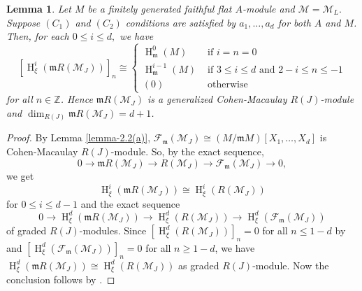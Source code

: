 \documentclass[11pt,reqno]{amsart}
\newtheorem{lemma}[theorem]{Lemma}
\theoremstyle{definition}
\newcommand{\m}{\mathfrak m}
\def\F{{\mathcal F}}
\def\M{{\mathcal M}}
\DeclareMathOperator{\h}{H}
\numberwithin{equation}{section}
\begin{document}
    \begin{lemma}\label{lemma-2.6(b)}
   Let $M$ be a finitely generated faithful flat $A$-module and $\M=\M_L.$  Suppose $(C_1)$ and $(C_2)$ conditions are satisfied by $a_1,\ldots,a_d$ for both $A$ and $M$. Then, for each $0\leq i\leq d,$ we have 
		$$[\h_\xi^i(\m R(\M_J))]_n\cong\begin{cases} \h_\m^0(M)  & \mbox{ if } i=n=0\\
			\h_\m^{i-1}(M) & \mbox{ if } 3\leq i\leq d\mbox{ and } 2-i\leq n\leq -1\\
			(0) & \mbox{ otherwise }  
		\end{cases}$$
		for all $n\in\mathbb{Z}$. Hence $\m R(\M_J)$ is a generalized Cohen-Macaulay $R(J)$-module and $\dim_{R(J)} \m R(\M_J)=d+1$.
	\end{lemma}
	\begin{proof}
		By Lemma \ref{lemma-2.2(a)}, $\F_{\m}(\M_J)\cong (M/\m M)[X_1,\ldots,X_d]$ is Cohen-Macaulay $R(J)$-module. So, by the exact sequence, $$0\to \m R(\M_J)\to R(\M_J)\to \F_{\m}(\M_J)\to 0,$$ we get 
		$$\h_\xi^i(\m R(\M_J))\cong \h_\xi^i(R(\M_J))$$  for $0\leq i\leq d-1$ and the exact sequence $$0\to\h_\xi^d(\m R(\M_J))\to\h_\xi^d(R(\M_J))\to\h_\xi^d(\F_{\m}(\M_J))$$
		of graded $R(J)$-modules.  Since $[\h_\xi^d(R(\M_J))]_n=0$ for all $n\leq 1-d$ by \cite[Theorem 6.2]{trung-gcm} and $[\h_\xi^d(\F_{\m}(\M_J))]_n=0$ for all $n\geq 1-d$, we have 
		$\h_\xi^d(\m R(\M_J))\cong \h_\xi^d(R(\M_J))$ as graded $R(J)$-module. Now the conclusion follows by \cite[Theorem 6.2]{trung-gcm}.
	\end{proof}
	
\end{document}

